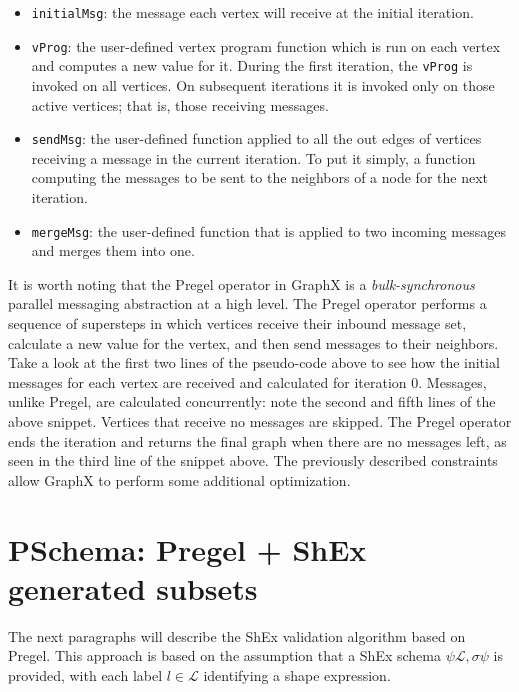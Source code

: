 \begin{itemize}
    \itemsep0.5em
    \item \texttt{initialMsg}: the message each vertex will receive at the initial iteration.
    \item \texttt{vProg}: the user-defined vertex program function which is run on each vertex and computes a new value for it. During the first iteration, the \texttt{vProg} is invoked on all vertices. On subsequent iterations it is invoked only on those active vertices; that is, those receiving messages.
    \item \texttt{sendMsg}: the user-defined function applied to all the out edges of vertices receiving a message in the current iteration. To put it simply, a function computing the messages to be sent to the neighbors of a node for the next iteration.
    \item \texttt{mergeMsg}: the user-defined function that is applied to two incoming messages and merges them into one.
\end{itemize}

\begin{pseudocode}
    
\end{pseudocode}

It is worth noting that the Pregel operator in GraphX is a \textit{bulk-synchronous} parallel messaging abstraction at a high level. The Pregel operator performs a sequence of supersteps in which vertices receive their inbound message set, calculate a new value for the vertex, and then send messages to their neighbors. Take a look at the first two lines of the pseudo-code above to see how the initial messages for each vertex are received and calculated for iteration 0. Messages, unlike Pregel, are calculated concurrently: note the second and fifth lines of the above snippet. Vertices that receive no messages are skipped. The Pregel operator ends the iteration and returns the final graph when there are no messages left, as seen in the third line of the snippet above. The previously described constraints allow GraphX to perform some additional optimization.

\section{PSchema: Pregel + ShEx generated subsets}

The next paragraphs will describe the ShEx validation algorithm based on Pregel. This approach is based on the assumption that a ShEx schema $\psi \mathcal{L},\sigma \psi$ is provided,  with each label $l \in \mathcal{L}$ identifying a shape expression.

